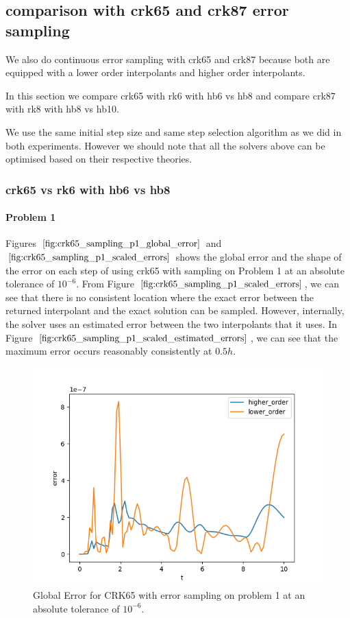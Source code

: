 \subsection{comparison with crk65 and crk87 error sampling}
We also do continuous error sampling with crk65 and crk87 because both are equipped with a lower order interpolants and higher order interpolants. 

In this section we compare crk65 with rk6 with hb6 vs hb8 and compare crk87 with rk8 with hb8 vs hb10.

We use the same initial step size and same step selection algorithm as we did in both experiments. However we should note that all the solvers above can be optimised based on their respective theories.

\subsubsection{crk65 vs rk6 with hb6 vs hb8}

\paragraph{Problem 1} Figures $\ref{fig:crk65_sampling_p1_global_error}$ and $\ref{fig:crk65_sampling_p1_scaled_errors}$ shows the global error and the shape of the error on each step of using crk65 with sampling on Problem 1 at an absolute tolerance of $10^{-6}$. From Figure $\ref{fig:crk65_sampling_p1_scaled_errors}$, we can see that there is no consistent location where the exact error between the returned interpolant and the exact solution can be sampled. However, internally, the solver uses an estimated error between the two interpolants that it uses. In Figure $\ref{fig:crk65_sampling_p1_scaled_estimated_errors}$, we can see that the maximum error occurs reasonably consistently at $0.5h$.

\begin{figure}[H]
\centering
\includegraphics[width=0.7\linewidth]{./figures/crk65_sampling_p1_global_error}
\caption{Global Error for CRK65 with error sampling on problem 1 at an absolute tolerance of $10^{-6}$.}
\label{fig:crk65_sampling_p1_global_error}
\end{figure}

